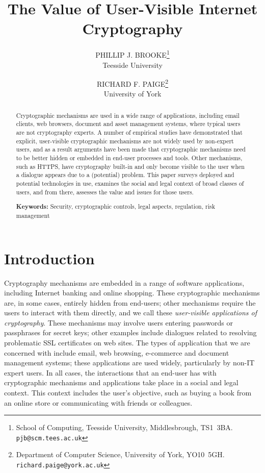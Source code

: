 \documentclass{article}
\begin{document}
\title{The Value of User-Visible Internet Cryptography}
            
\author{PHILLIP J. BROOKE\footnote{School of Computing, Teesside
University, Middlesbrough, TS1~3BA.  \texttt{pjb@scm.tees.ac.uk}}\\Teesside University
  \and RICHARD F. PAIGE\footnote{Department of Computer Science,
University of York, YO10~5GH.  \texttt{richard.paige@york.ac.uk}}\\University of York
}
        


\maketitle

    
\begin{abstract} 
  Cryptographic mechanisms are used in a wide range of applications,
  including email clients, web browsers, document and
  asset management systems, where typical users are not cryptography
  experts.  A number of empirical studies have
  demonstrated that explicit, user-visible cryptographic mechanisms
  are not widely used by non-expert users, and as a result arguments
  have been made that cryptographic mechanisms need to be better
  hidden or embedded in end-user processes and tools.  Other
  mechanisms, such as HTTPS, have cryptography built-in and only
  become visible to the user when a dialogue appears due to a
  (potential) problem.  This paper surveys deployed and potential
  technologies in use, examines the social and legal context of broad
  classes of users, and from there, assesses the value and issues for
  those users.

\textbf{Keywords:} Security, cryptographic controls, legal aspects, regulation, risk management



\end{abstract}
            
            
\section{Introduction}

Cryptography mechanisms are embedded in a range of software
applications, including Internet banking and online shopping. These cryptographic
mechanisms are, in some cases, entirely hidden from end-users; other mechanisms 
require the users to interact with them directly, and we call these
\emph{user-visible applications of cryptography}.  These mechanisms may involve users
entering passwords or passphrases for secret keys; 
other examples include dialogues related to resolving
problematic SSL certificates on web sites. 
The types of application that we are concerned with include email, web
browsing, e-commerce and document management systems; these applications are
used widely, particularly by non-IT expert users. In
all cases, the interactions that an end-user has with cryptographic mechanisms and
applications take place in a social and legal context.  This context includes the user's objective, 
such as buying a book from an online store or communicating with friends or colleagues.  
\end{document}
